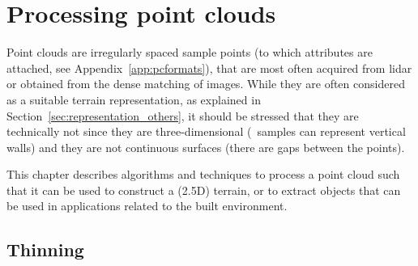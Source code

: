 
\graphicspath{{pcprocessing/figs/}}


\chapter{Processing point clouds}%
\label{chap:pcprocessing}

Point clouds are irregularly spaced sample points (to which attributes are attached, see Appendix~\ref{app:pcformats}), that are most often acquired from lidar or obtained from the dense matching of images.
While they are often considered as a suitable terrain representation, as explained in Section~\ref{sec:representation_others}, it should be stressed that they are technically not since they are three-dimensional (\eg\ samples can represent vertical walls) and they are not continuous surfaces (there are gaps between the points).

This chapter describes algorithms and techniques to process a point cloud such that it can be used to construct a (2.5D) terrain, or to extract objects that can be used in applications related to the built environment.



%
\section{Thinning}%
\label{sec:thinning}%

